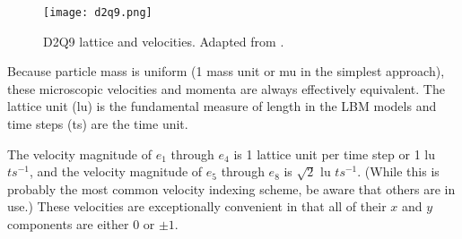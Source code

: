 \begin{figure}[t!]
	\centering
		\texttt{[image: d2q9.png]}
	\caption{D2Q9 lattice and velocities. Adapted from \citep{sukop2006lattice}.}
	\label{fig:d2q9}
\end{figure}

Because particle mass is uniform (1 mass unit or mu in the simplest approach), these microscopic velocities and momenta are always effectively equivalent. The lattice unit (lu) is the fundamental measure of length in the LBM models and time steps (ts) are the time unit. 

The velocity magnitude of $e_1$ through $e_4$ is 1 lattice unit per time step or 1 lu ${ts}^{-1}$, and the velocity magnitude of $e_5$ through $e_8$ is $\sqrt{2}$ lu ${ts}^{-1}$. (While this is probably the most common velocity indexing scheme, be aware that others are in use.) These velocities are exceptionally convenient in that all of their $x$ and $y$ components are either $0$ or $\pm 1$.
